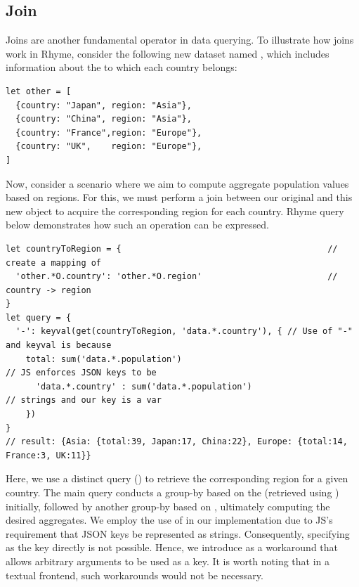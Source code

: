\documentclass[runningheads]{llncs}
\newcommand{\lang}{Rhyme}
\begin{document}
\vspace{-3mm}
\subsection{Join}
\vspace{-2mm}
Joins are another fundamental operator in data querying.
To illustrate how joins work in \lang{}, consider the following
new dataset named , which includes information about the
 to which each country belongs:

\begin{lstlisting}[style=JavaScript, columns=flexible]
let other = [
  {country: "Japan", region: "Asia"},
  {country: "China", region: "Asia"},
  {country: "France",region: "Europe"},
  {country: "UK",    region: "Europe"},
]
\end{lstlisting}
\vspace{-2mm}

Now, consider a scenario where we aim to compute aggregate population
values based on regions.
For this, we must perform a join between our original
 and this new  object to acquire the
corresponding region for each country.
\lang{} query below demonstrates how such an operation can be
expressed.

\begin{lstlisting}[style=JavaScript, columns=flexible]
let countryToRegion = {                                         // create a mapping of 
  'other.*O.country': 'other.*O.region'                         // country -> region
}
let query = {
  '-': keyval(get(countryToRegion, 'data.*.country'), { // Use of "-" and keyval is because
    total: sum('data.*.population')                                       // JS enforces JSON keys to be
      'data.*.country' : sum('data.*.population')                         // strings and our key is a var
    })
}
// result: {Asia: {total:39, Japan:17, China:22}, Europe: {total:14, France:3, UK:11}}
\end{lstlisting}

Here, we use a distinct query () to retrieve the
corresponding region for a given country.
The main query conducts a group-by based on the  (retrieved using ) initially,
followed by another group-by based on , ultimately computing the
desired aggregates.
 We employ the use of  in our implementation due to JS's requirement that JSON
keys be represented as strings.
Consequently, specifying  as the key directly
is not possible.
Hence, we introduce  as a workaround that allows arbitrary
arguments to be used as a key.
It is worth noting that in a textual frontend, such workarounds would not be necessary.
\end{document}
